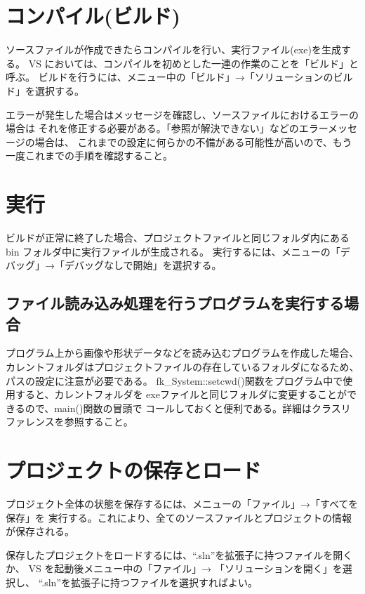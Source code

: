 \documentclass[a4j]{jarticle}
\begin{document}
\section{コンパイル(ビルド)}
ソースファイルが作成できたらコンパイルを行い、実行ファイル(exe)を生成する。
VS においては、コンパイルを初めとした一連の作業のことを「ビルド」と呼ぶ。
ビルドを行うには、メニュー中の「ビルド」→「ソリューションのビルド」を選択する。

エラーが発生した場合はメッセージを確認し、ソースファイルにおけるエラーの場合は
それを修正する必要がある。「参照が解決できない」などのエラーメッセージの場合は、
これまでの設定に何らかの不備がある可能性が高いので、もう一度これまでの手順を確認すること。


\section{実行}
ビルドが正常に終了した場合、プロジェクトファイルと同じフォルダ内にある 
bin フォルダ中に実行ファイルが生成される。
実行するには、メニューの「デバッグ」→「デバッグなしで開始」を選択する。

\subsection{ファイル読み込み処理を行うプログラムを実行する場合}
プログラム上から画像や形状データなどを読み込むプログラムを作成した場合、
カレントフォルダはプロジェクトファイルの存在しているフォルダになるため、
パスの設定に注意が必要である。
fk\_System::setcwd()関数をプログラム中で使用すると、カレントフォルダを
exeファイルと同じフォルダに変更することができるので、main()関数の冒頭で
コールしておくと便利である。詳細はクラスリファレンスを参照すること。


\section{プロジェクトの保存とロード}
プロジェクト全体の状態を保存するには、メニューの「ファイル」→「すべてを保存」を
実行する。これにより、全てのソースファイルとプロジェクトの情報が保存される。

保存したプロジェクトをロードするには、``.sln''を拡張子に持つファイルを開くか、
VS を起動後メニュー中の「ファイル」→ 「ソリューションを開く」を選択し、
``.sln''を拡張子に持つファイルを選択すればよい。
\end{document}
